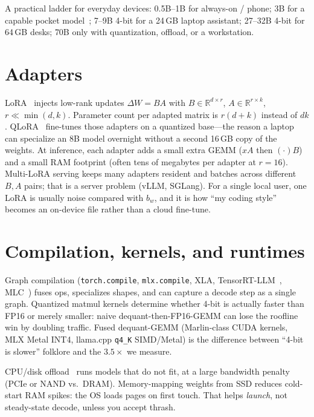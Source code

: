 A practical ladder for everyday devices: 0.5B--1B for always-on / phone; 3B for a capable pocket model~\citep{gunter2024apple,abdin2024phi3}; 7--9B 4-bit for a 24\,GB laptop assistant; 27--32B 4-bit for 64\,GB desks; 70B only with quantization, offload, or a workstation.

\section{Adapters}
\label{sec:lora}

LoRA~\citep{hu2022lora} injects low-rank updates \(\Delta W = BA\) with \(B\in\mathbb{R}^{d\times r}\), \(A\in\mathbb{R}^{r\times k}\), \(r\ll \min(d,k)\). Parameter count per adapted matrix is \(r(d+k)\) instead of \(dk\). QLoRA~\citep{dettmers2023qlora} fine-tunes those adapters on a quantized base---the reason a laptop can specialize an 8B model overnight without a second 16\,GB copy of the weights. At inference, each adapter adds a small extra GEMM (\(xA\) then \((\cdot)B\)) and a small RAM footprint (often tens of megabytes per adapter at \(r=16\)). Multi-LoRA serving keeps many adapters resident and batches across different \(B,A\) pairs; that is a server problem (vLLM, SGLang). For a single local user, one LoRA is usually noise compared with \(b_w\), and it is how ``my coding style'' becomes an on-device file rather than a cloud fine-tune.

\section{Compilation, kernels, and runtimes}
\label{sec:runtime}

Graph compilation (\texttt{torch.compile}, \texttt{mlx.compile}, XLA, TensorRT-LLM~\citep{nvidia2024trtllm}, MLC~\citep{mlcllm}) fuses ops, specializes shapes, and can capture a decode step as a single graph. Quantized matmul kernels determine whether 4-bit is actually faster than FP16 or merely smaller: naive dequant-then-FP16-GEMM can lose the roofline win by doubling traffic. Fused dequant-GEMM (Marlin-class CUDA kernels, MLX Metal INT4, llama.cpp \texttt{q4\_K} SIMD/Metal) is the difference between ``4-bit is slower'' folklore and the \(3.5\times\) we measure.

CPU/disk offload~\citep{sheng2023flexgen,alizadeh2024llm} runs models that do not fit, at a large bandwidth penalty (PCIe or NAND vs.\ DRAM). Memory-mapping weights from SSD reduces cold-start RAM spikes: the OS loads pages on first touch. That helps \emph{launch}, not steady-state decode, unless you accept thrash.

